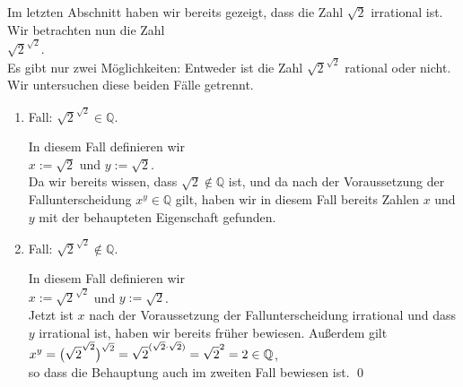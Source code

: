 \proof
Im letzten Abschnitt haben wir bereits gezeigt, dass die Zahl $\sqrt{2}$ irrational ist.  Wir
betrachten nun die Zahl 
\\[0.2cm]
\hspace*{1.3cm}
$\sqrt{2}^{\sqrt{2}}$.
\\[0.2cm]
Es gibt nur zwei Möglichkeiten: Entweder ist die Zahl $\sqrt{2}^{\sqrt{2}}$ rational oder nicht.  Wir
untersuchen diese beiden Fälle getrennt.
\begin{enumerate}
\item Fall: $\sqrt{2}^{\sqrt{2}} \in \mathbb{Q}$.

      In diesem Fall definieren wir
      \\[0.2cm]
      \hspace*{1.3cm}
      $x := \sqrt{2}$ \quad und \quad $y := \sqrt{2}$.  
      \\[0.2cm]
      Da wir bereits wissen,
      dass $\sqrt{2} \not\in \mathbb{Q}$ ist, und da nach der Voraussetzung der
      Fallunterscheidung $x^y \in \mathbb{Q}$ gilt, haben wir in diesem Fall bereits Zahlen $x$ und
      $y$ mit der behaupteten Eigenschaft gefunden.
\item Fall:  $\sqrt{2}^{\sqrt{2}} \not\in \mathbb{Q}$.

      In diesem Fall definieren wir 
      \\[0.2cm]
      \hspace*{1.3cm}
      $x := \sqrt{2}^{\sqrt{2}}$ \quad und \quad $y := \sqrt{2}$.
      \\[0.2cm]
      Jetzt ist $x$ nach der Voraussetzung der Fallunterscheidung irrational und dass $y$ irrational
      ist, haben wir bereits früher bewiesen.  Außerdem gilt
      \\[0.2cm]
      \hspace*{1.3cm}
      $\displaystyle x^y = \bigl(\sqrt{2}^{\sqrt{2}}\bigr)^{\sqrt{2}} = \sqrt{2}^{(\sqrt{2} \cdot \sqrt{2})} = \sqrt{2}^{2} = 2 \in \mathbb{Q}$,
      \\[0.2cm]
      so dass die Behauptung auch im zweiten Fall bewiesen ist.  \qed
\end{enumerate}

